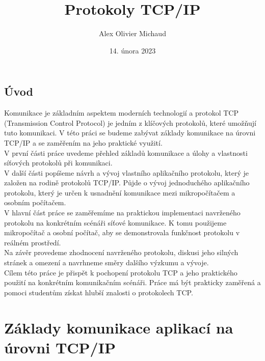 \documentclass[12pt]{report}			%
\author{Alex Olivier Michaud}
\title{Protokoly TCP/IP}
\date{14. února 2023}
\begin{document}
	\mytitlepage						%
	
	
	\abstrakt{
		\lipsum[1]						%
	}{
		\lipsum[1]						%
	}
	
	\podekovani{
		\lipsum[2]						%
	}
	
   {\tableofcontents\newpage}			%
	
\addtocounter{page}{1}		%
	\chapter*{Úvod}
	
	Komunikace je základním aspektem moderních technologií a protokol TCP (Transmission Control Protocol) je jedním z klíčových protokolů, které umožňují tuto komunikaci. V této práci se budeme zabývat základy komunikace na úrovni TCP/IP a se zaměřením na jeho praktické využití.
\\
V první části práce uvedeme přehled základů komunikace a úlohy a vlastnosti síťových protokolů při komunikaci.
\\
V další části popíšeme návrh a vývoj vlastního aplikačního protokolu, který je založen na rodině protokolů TCP/IP. Půjde o vývoj jednoduchého aplikačního protokolu, který je určen k usnadnění komunikace mezi mikropočítačem a osobním počítačem.
\\
V hlavní část práce se zaměřemíme na praktickou implementaci navrženého protokolu na konkrétním scénáři síťové komunikace. K tomu použijeme mikropočítač a osobní počítač, aby se demonstrovala funkčnost protokolu v reálném prostředí.
\\
Na závěr provedeme zhodnocení navrženého protokolu, diskusi jeho silných stránek a omezení a navrhneme směry dalšího výzkumu a vývoje.
\\
Cílem této práce je přispět k pochopení protokolu TCP a jeho praktického použití na konkrétním komunikačním scénáři. Práce má být prakticky zaměřená a pomoci studentům získat hlubší znalosti o protokolech TCP.	
	
	
	\part{Základy komunikace aplikací na úrovni TCP/IP}
	
\end{document}
